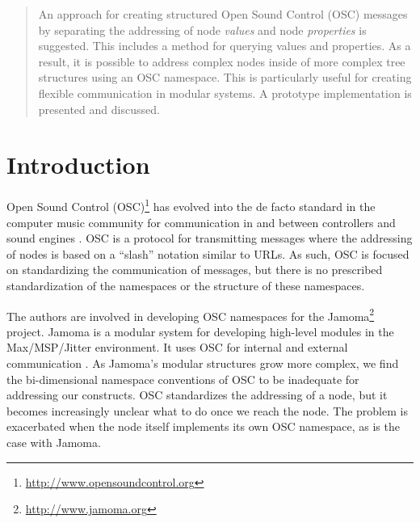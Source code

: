 \documentclass{NIME-alternate}
\begin{document}
\maketitle



\begin{abstract}

An approach for creating structured Open Sound Control (OSC) messages by separating the addressing of node \emph{values} and node \emph{properties} is suggested. This includes a method for querying values and properties. As a result, it is possible to address complex nodes inside of more complex tree structures using an OSC namespace. This is particularly useful for creating flexible communication in modular systems.  A prototype implementation is presented and discussed.

\end{abstract}




\section{Introduction} %
\label{sec:introduction}

Open Sound Control (OSC)\footnote{\url{http://www.opensoundcontrol.org}} has evolved into the de facto standard in the computer music community for communication in and between controllers and sound engines \cite{Wright:2003}. OSC is a protocol for transmitting messages where the addressing of nodes is based on a ``slash'' notation similar to URLs. As such, OSC is focused on standardizing the communication of messages, but there is no prescribed standardization of the namespaces or the structure of these namespaces. 

The authors are involved in developing OSC namespaces for the Jamoma\footnote{\url{http://www.jamoma.org}} project. Jamoma is a modular system for developing high-level modules in the Max/MSP/Jitter environment. It uses OSC for internal and external communication \cite{Place:2006}.  As Jamoma's modular structures grow more complex, we find the bi-dimensional namespace conventions of OSC to be inadequate for addressing our constructs.  OSC standardizes the addressing of a node, but it becomes increasingly unclear what to do once we reach the node.  The problem is exacerbated when the node itself implements its own OSC namespace, as is the case with Jamoma.
\end{document}

